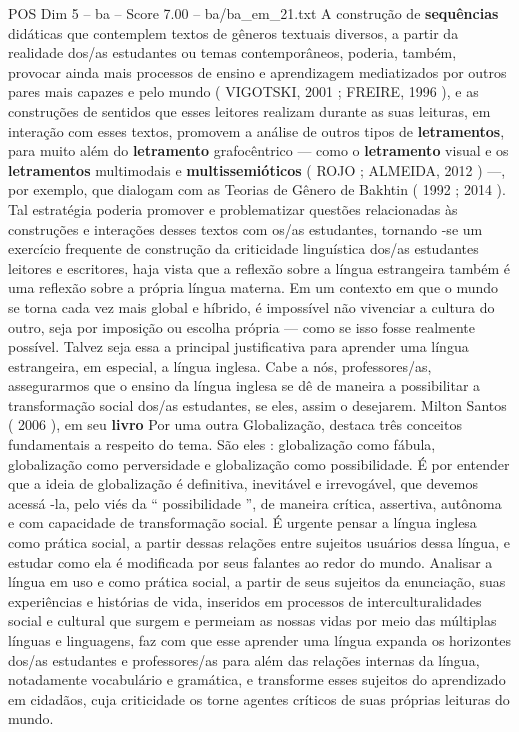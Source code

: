 \begin{textsample}{POS Dim 5 – ba – Score 7.00 – ba/ba\_em\_21.txt}
A construção de \textbf{sequências} didáticas que contemplem textos de gêneros textuais diversos, a partir da realidade dos/as estudantes ou temas contemporâneos, poderia, também, provocar ainda mais processos de ensino e aprendizagem mediatizados por outros pares mais capazes e pelo mundo ( VIGOTSKI, 2001 ; FREIRE, 1996 ), e as construções de sentidos que esses leitores realizam durante as suas leituras, em interação com esses textos, promovem a análise de outros tipos de \textbf{letramentos}, para muito além do \textbf{letramento} grafocêntrico — como o \textbf{letramento} visual e os \textbf{letramentos} multimodais e \textbf{multissemióticos} ( ROJO ; ALMEIDA, 2012 ) —, por exemplo, que dialogam com as Teorias de Gênero de Bakhtin ( 1992 ; 2014 ).
Tal estratégia poderia promover e problematizar questões relacionadas às construções e interações desses textos com os/as estudantes, tornando -se um exercício frequente de construção da criticidade linguística dos/as estudantes leitores e escritores, haja vista que a reflexão sobre a língua estrangeira também é uma reflexão sobre a própria língua materna.
Em um contexto em que o mundo se torna cada vez mais global e híbrido, é impossível não vivenciar a cultura do outro, seja por imposição ou escolha própria — como se isso fosse realmente possível.
Talvez seja essa a principal justificativa para aprender uma língua estrangeira, em especial, a língua inglesa.
Cabe a nós, professores/as, assegurarmos que o ensino da língua inglesa se dê de maneira a possibilitar a transformação social dos/as estudantes, se eles, assim o desejarem.
Milton Santos ( 2006 ), em seu \textbf{livro} Por uma outra Globalização, destaca três conceitos fundamentais a respeito do tema.
São eles : globalização como fábula, globalização como perversidade e globalização como possibilidade.
É por entender que a ideia de globalização é definitiva, inevitável e irrevogável, que devemos acessá -la, pelo viés da “ possibilidade ”, de maneira crítica, assertiva, autônoma e com capacidade de transformação social.
É urgente pensar a língua inglesa como prática social, a partir dessas relações entre sujeitos usuários dessa língua, e estudar como ela é modificada por seus falantes ao redor do mundo.
Analisar a língua em uso e como prática social, a partir de seus sujeitos da enunciação, suas experiências e histórias de vida, inseridos em processos de interculturalidades social e cultural que surgem e permeiam as nossas vidas por meio das múltiplas línguas e linguagens, faz com que esse aprender uma língua expanda os horizontes dos/as estudantes e professores/as para além das relações internas da língua, notadamente vocabulário e gramática, e transforme esses sujeitos do aprendizado em cidadãos, cuja criticidade os torne agentes críticos de suas próprias leituras do mundo.

\end{textsample}
